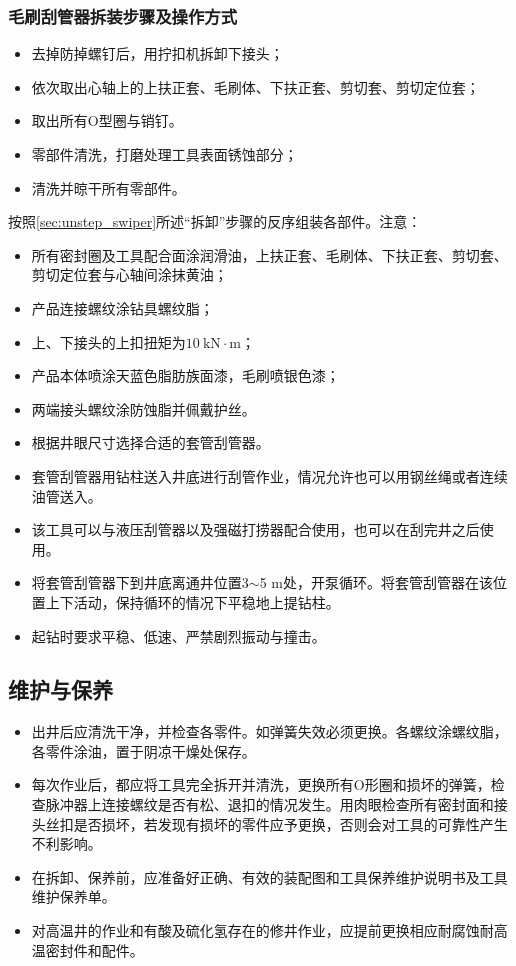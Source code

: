 \subsubsection{毛刷刮管器拆装步骤及操作方式}
\label{sec:unstep_swiper}
	\begin{itemize}
	\item 去掉防掉螺钉后，用拧扣机拆卸下接头；
	\item 依次取出心轴上的上扶正套、毛刷体、下扶正套、剪切套、剪切定位套；
	\item 取出所有O型圈与销钉。
	\item 零部件清洗，打磨处理工具表面锈蚀部分；
	\item 清洗并晾干所有零部件。
	\end{itemize}
按照\ref{sec:unstep_swiper}所述“拆卸”步骤的反序组装各部件。注意：
\begin{itemize}
	\item 所有密封圈及工具配合面涂润滑油，上扶正套、毛刷体、下扶正套、剪切套、剪切定位套与心轴间涂抹黄油；
	\item 产品连接螺纹涂钻具螺纹脂；
	\item 上、下接头的上扣扭矩为$10\ \mathrm{kN\cdot m}$；
	\item 产品本体喷涂天蓝色脂肪族面漆，毛刷喷银色漆；
	\item 两端接头螺纹涂防蚀脂并佩戴护丝。
	\end{itemize}
\begin{itemize}
	\item 	根据井眼尺寸选择合适的套管刮管器。
	\item 套管刮管器用钻柱送入井底进行刮管作业，情况允许也可以用钢丝绳或者连续油管送入。
\end{itemize}
\begin{itemize}
	\item 	该工具可以与液压刮管器以及强磁打捞器配合使用，也可以在刮完井之后使用。
	\item 	将套管刮管器下到井底离通井位置3$\sim$5 m处，开泵循环。将套管刮管器在该位置上下活动，保持循环的情况下平稳地上提钻柱。
	\item 	起钻时要求平稳、低速、严禁剧烈振动与撞击。
\end{itemize}

\subsection{维护与保养}
\begin{itemize}
	\item 	出井后应清洗干净，并检查各零件。如弹簧失效必须更换。各螺纹涂螺纹脂，各零件涂油，置于阴凉干燥处保存。
\item 	 每次作业后，都应将工具完全拆开并清洗，更换所有O形圈和损坏的弹簧，检查脉冲器上连接螺纹是否有松、退扣的情况发生。用肉眼检查所有密封面和接头丝扣是否损坏，若发现有损坏的零件应予更换，否则会对工具的可靠性产生不利影响。
\item 	在拆卸、保养前，应准备好正确、有效的装配图和工具保养维护说明书及工具维护保养单。
\item 	对高温井的作业和有酸及硫化氢存在的修井作业，应提前更换相应耐腐蚀耐高温密封件和配件。
\end{itemize}

